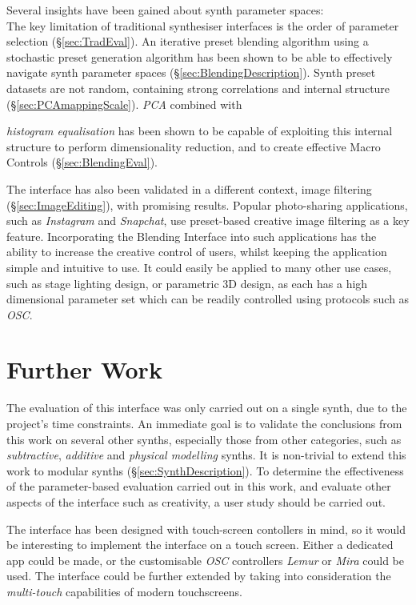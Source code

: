 \documentclass[11pt, oneside]{report}   	%
\begin{document}
Several insights have been gained about synth parameter spaces: \\
The key limitation of traditional synthesiser interfaces is the order of parameter selection (\S \ref{sec:TradEval}). An iterative preset blending algorithm using a stochastic preset generation algorithm has been shown to be able to effectively navigate synth parameter spaces (\S \ref{sec:BlendingDescription}). Synth preset datasets are not random, containing strong correlations and internal structure (\S \ref{sec:PCAmappingScale}). \emph{PCA} combined with {\emph{histogram equalisation} has been shown to be capable of exploiting this internal structure to perform dimensionality reduction, and to create effective Macro Controls (\S \ref{sec:BlendingEval}).
	
The interface has also been validated in a different context, image filtering (\S \ref{sec:ImageEditing}), with promising results. Popular photo-sharing applications, such as \emph{Instagram} and \emph{Snapchat}, use preset-based creative image filtering as a key feature. Incorporating the Blending Interface into such applications has the ability to increase the creative control of users, whilst keeping the application simple and intuitive to use.  It could easily be applied to many other use cases, such as stage lighting design, or parametric 3D design, as each has a high dimensional parameter set which can be readily controlled using protocols such as \emph{OSC}.
\section{Further Work}
The evaluation of this interface was only carried out on a single synth, due to the project's time constraints. An immediate goal is to validate the conclusions from this work on several other synths, especially those from other categories, such as \emph{subtractive}, \emph{additive} and \emph{physical modelling} synths. It is non-trivial to extend this work to modular synths (\S \ref{sec:SynthDescription}). To determine the effectiveness of the parameter-based evaluation carried out in this work, and evaluate other aspects of the interface such as creativity, a user study should be carried out.

The interface has been designed with touch-screen contollers in mind, so it would be interesting to implement the interface on a touch screen. Either a dedicated app could be made, or the customisable \emph{OSC} controllers \emph{Lemur} or \emph{Mira} could be used. The interface could be further extended by taking into consideration the \emph{multi-touch} capabilities of modern touchscreens.

}
\end{document}
